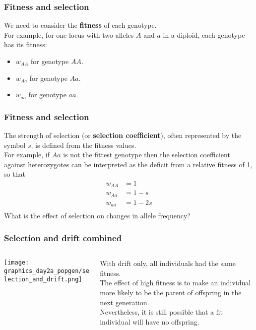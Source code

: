 \documentclass{beamer}
\newcommand{\1}{\ensuremath{\mathbf{1}}}
\begin{document}
%
%
%
\begin{frame}\frametitle{Fitness and selection}
	We need to consider the \textbf{fitness} of each genotype.\\[2ex]
	For example, for one locus with two alleles $A$ and $a$ in a diploid, each genotype has its fitness:
	\begin{itemize}
		\item $w_{AA}$ for genotype $AA$.
		\item $w_{Aa}$ for genotype $Aa$.
		\item $w_{aa}$ for genotype $aa$.
	\end{itemize}
\end{frame}
%
%
%
\begin{frame}\frametitle{Fitness and selection}
	The strength of selection (or \textbf{selection coefficient}), often represented by the symbol $s$, is defined from the fitness values.\\[2ex]
	For example, if $Aa$ is not the fittest genotype then the selection coefficient against heterozygotes can be interpreted as the deficit from a relative fitness of 1, so that
	\begin{equation}
		\begin{split}
			w_{AA} & = 1\\
			w_{Aa} & = 1-s\\
			w_{aa} & = 1-2s\\
		\end{split}
	\end{equation}
	What is the effect of selection on changes in allele frequency?
\end{frame}
%
%
%
\begin{frame}\frametitle{Selection and drift combined}
	\begin{columns}
	\begin{column}{.5\textwidth}
		\begin{center}
			\texttt{[image: graphics\_day2a\_popgen/selection\_and\_drift.png]}
		\end{center}		
	\end{column}
	\begin{column}{.5\textwidth}
		With drift only, all individuals had the same fitness.\\[1.5ex]
		The effect of high fitness is to make an individual more likely to be the parent of offspring in the next generation.\\[1.5ex]
		Nevertheless, it is still possible that a fit individual will have no offspring.
	\end{column}
	\end{columns}
\end{frame}
\end{document}

